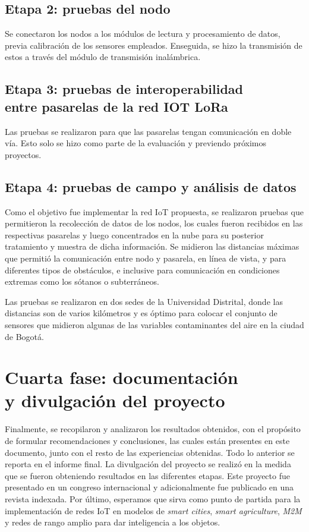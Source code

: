 \subsection{Etapa 2: pruebas del nodo}
Se conectaron los nodos a los módulos de lectura y procesamiento de datos, previa calibración de los sensores empleados. Enseguida, se hizo la transmisión de estos a través del módulo de transmisión inalámbrica.

\subsection[Etapa 3: pruebas de interoperabilidad entre pasarelas de la red IOT LoRa]{Etapa 3: pruebas de interoperabilidad\\ entre pasarelas de la red IOT LoRa}

Las pruebas se realizaron para que las pasarelas tengan comunicación en doble vía. Esto solo se hizo como parte de la evaluación y previendo próximos proyectos. 

\subsection{Etapa 4: pruebas de campo y análisis de datos}

Como el objetivo fue implementar la red IoT propuesta, se realizaron pruebas que permitieron la recolección de datos de los nodos, los cuales fueron recibidos en las respectivas pasarelas y luego concentrados en la nube para su posterior tratamiento y muestra de dicha información. Se midieron las distancias máximas que permitió la comunicación entre nodo y pasarela, en línea de vista, y para diferentes tipos de obstáculos, e inclusive para comunicación en condiciones extremas como los sótanos o subterráneos.

Las pruebas se realizaron en dos sedes de la Universidad Distrital, donde las distancias son de varios kilómetros y es óptimo para colocar el conjunto de sensores que midieron algunas de las variables contaminantes del aire en la ciudad de Bogotá.

\section[Cuarta fase: documentación y divulgación del proyecto]{Cuarta fase: documentación\\ y divulgación del proyecto}

Finalmente, se recopilaron y analizaron los resultados obtenidos, con el propósito de formular recomendaciones y conclusiones, las cuales están presentes en este documento, junto con el resto de las experiencias obtenidas. Todo lo anterior se reporta en el informe final. La divulgación del proyecto se realizó en la medida que se fueron obteniendo resultados en las diferentes etapas. Este proyecto fue presentado en un congreso internacional y adicionalmente fue publicado en una revista indexada. Por último, esperamos que sirva como punto de partida para la implementación de redes IoT en modelos de \emph{smart cities}, \emph{smart agriculture}, \emph{M2M} y redes de rango amplio para dar inteligencia a los objetos.

\newpage\thispagestyle{empty}
